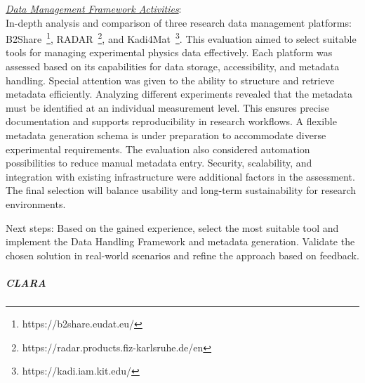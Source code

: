 \underline{\em{Data Management Framework Activities}}: \\ 
In-depth analysis and comparison of three research data management platforms: B2Share~\footnote{https://b2share.eudat.eu/}, RADAR~\footnote{https://radar.products.fiz-karlsruhe.de/en}, and Kadi4Mat~\footnote{https://kadi.iam.kit.edu/}. This evaluation aimed to select suitable tools for managing experimental physics data effectively. Each platform was assessed based on its capabilities for data storage, accessibility, and metadata handling. Special attention was given to the ability to structure and retrieve metadata efficiently. Analyzing different experiments revealed that the metadata must be identified at an individual measurement level. This ensures precise documentation and supports reproducibility in research workflows. A flexible metadata generation schema is under preparation to accommodate diverse experimental requirements. The evaluation also considered automation possibilities to reduce manual metadata entry. Security, scalability, and integration with existing infrastructure were additional factors in the assessment. The final selection will balance usability and long-term sustainability for research environments.

Next steps: Based on the gained experience, select the most suitable tool and implement the Data Handling Framework and metadata generation. Validate the chosen solution in real-world scenarios and refine the approach based on feedback.


\subparagraph{CLARA}
 
